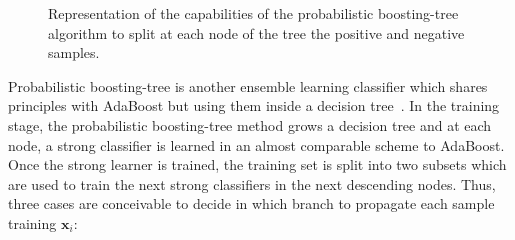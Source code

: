 \begin{figure}
\centering
\caption[Representation of the probabilistic boosting-tree.]{Representation of the capabilities of the probabilistic boosting-tree algorithm to split at each node of the tree the positive and negative samples.}
\label{fig:pbtsim}
\end{figure}

Probabilistic boosting-tree is another ensemble learning classifier which shares principles with AdaBoost but using them inside a decision tree~\cite{Tu2005}. 
In the training stage, the probabilistic boosting-tree method grows a decision tree and at each node, a strong classifier is learned in an almost comparable scheme to AdaBoost.
Once the strong learner is trained, the training set is split into two subsets which are used to train the next strong classifiers in the next descending nodes.
Thus, three cases are conceivable to decide in which branch to propagate each sample training $\mathbf{x}_i$:

